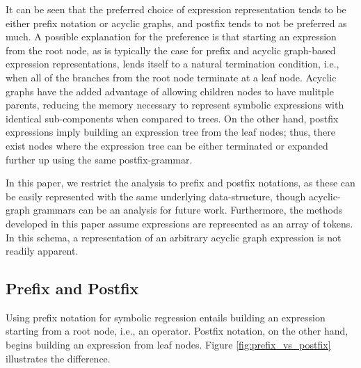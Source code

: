 \documentclass[runningheads]{llncs}
\begin{document}
It can be seen that the preferred choice of expression representation tends to be either prefix notation or acyclic graphs, and postfix tends to not be preferred as much. A possible explanation for the preference is that starting an expression from the root node, as is typically the case for prefix and acyclic graph-based expression representations, lends itself to a natural termination condition, i.e., when all of the branches from the root node terminate at a leaf node. Acyclic graphs have the added advantage of allowing children nodes to have mulitple parents, reducing the memory necessary to represent symbolic expressions with identical sub-components when compared to trees. On the other hand, postfix expressions imply building an expression tree from the leaf nodes; thus, there exist nodes where the expression tree can be either terminated or expanded further up using the same postfix-grammar. 

In this paper, we restrict the analysis to prefix and postfix notations, as these can be easily represented with the same underlying data-structure, though acyclic-graph grammars can be an analysis for future work. Furthermore, the methods developed in this paper assume expressions are represented as an array of tokens. In this schema, a representation of an arbitrary acyclic graph expression is not readily apparent.


\subsection{Prefix and Postfix}
Using prefix notation for symbolic regression entails building an expression starting from a root node, i.e., an operator. Postfix notation, on the other hand, begins building an expression from leaf nodes. Figure \ref{fig:prefix_vs_postfix} illustrates the difference.
\end{document}
